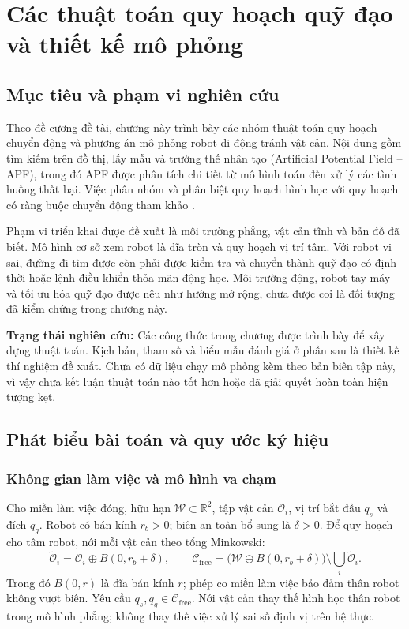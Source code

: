 \documentclass[12pt,a4paper,oneside]{report}
\numberwithin{equation}{chapter}
\begin{document}
\setcounter{chapter}{2}

\chapter{Các thuật toán quy hoạch quỹ đạo và thiết kế mô phỏng}

\section{Mục tiêu và phạm vi nghiên cứu}

Theo đề cương đề tài, chương này trình bày các nhóm thuật toán quy hoạch chuyển động và phương án mô phỏng robot di động tránh vật cản. Nội dung gồm tìm kiếm trên đồ thị, lấy mẫu và trường thế nhân tạo (Artificial Potential Field -- APF), trong đó APF được phân tích chi tiết từ mô hình toán đến xử lý các tình huống thất bại. Việc phân nhóm và phân biệt quy hoạch hình học với quy hoạch có ràng buộc chuyển động tham khảo \cite{lavalle}.

Phạm vi triển khai được đề xuất là môi trường phẳng, vật cản tĩnh và bản đồ đã biết. Mô hình cơ sở xem robot là đĩa tròn và quy hoạch vị trí tâm. Với robot vi sai, đường đi tìm được còn phải được kiểm tra và chuyển thành quỹ đạo có định thời hoặc lệnh điều khiển thỏa mãn động học. Môi trường động, robot tay máy và tối ưu hóa quỹ đạo được nêu như hướng mở rộng, chưa được coi là đối tượng đã kiểm chứng trong chương này.

\textbf{Trạng thái nghiên cứu:} Các công thức trong chương được trình bày để xây dựng thuật toán. Kịch bản, tham số và biểu mẫu đánh giá ở phần sau là thiết kế thí nghiệm đề xuất. Chưa có dữ liệu chạy mô phỏng kèm theo bản biên tập này, vì vậy chưa kết luận thuật toán nào tốt hơn hoặc đã giải quyết hoàn toàn hiện tượng kẹt.

\section{Phát biểu bài toán và quy ước ký hiệu}

\subsection{Không gian làm việc và mô hình va chạm}

Cho miền làm việc đóng, hữu hạn $\mathcal W\subset\mathbb R^2$, tập vật cản $\mathcal O_i$, vị trí bắt đầu $q_s$ và đích $q_g$. Robot có bán kính $r_b>0$; biên an toàn bổ sung là $\delta>0$. Để quy hoạch cho tâm robot, nới mỗi vật cản theo tổng Minkowski:
\begin{equation}
\widetilde{\mathcal O}_i=\mathcal O_i\oplus B(0,r_b+\delta),\qquad
\mathcal C_{\mathrm{free}}=
\bigl(\mathcal W\ominus B(0,r_b+\delta)\bigr)
\setminus\bigcup_i\widetilde{\mathcal O}_i.
\end{equation}
Trong đó $B(0,r)$ là đĩa bán kính $r$; phép co miền làm việc bảo đảm thân robot không vượt biên. Yêu cầu $q_s,q_g\in\mathcal C_{\mathrm{free}}$. Nới vật cản thay thế hình học thân robot trong mô hình phẳng; không thay thế việc xử lý sai số định vị trên hệ thực.
\end{document}
